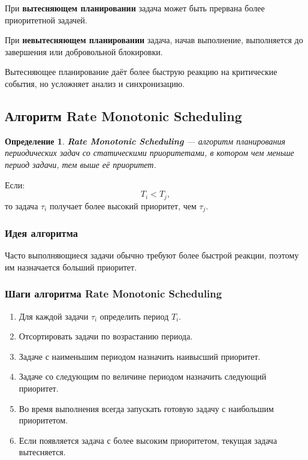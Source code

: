 \documentclass[12pt,a4paper]{article}
\newtheorem{definition}{Определение}
\begin{document}
При \textbf{вытесняющем планировании} задача может быть прервана более приоритетной задачей.

При \textbf{невытесняющем планировании} задача, начав выполнение, выполняется до завершения или добровольной блокировки.

Вытесняющее планирование даёт более быструю реакцию на критические события, но усложняет анализ и синхронизацию.

\subsection{Алгоритм Rate Monotonic Scheduling}

\begin{definition}
\textbf{Rate Monotonic Scheduling} --- алгоритм планирования периодических задач со статическими приоритетами, в котором чем меньше период задачи, тем выше её приоритет.
\end{definition}

Если:
\[
    T_i < T_j,
\]
то задача $\tau_i$ получает более высокий приоритет, чем $\tau_j$.

\subsubsection{Идея алгоритма}

Часто выполняющиеся задачи обычно требуют более быстрой реакции, поэтому им назначается больший приоритет.

\subsubsection{Шаги алгоритма Rate Monotonic Scheduling}

\begin{enumerate}
    \item Для каждой задачи $\tau_i$ определить период $T_i$.
    \item Отсортировать задачи по возрастанию периода.
    \item Задаче с наименьшим периодом назначить наивысший приоритет.
    \item Задаче со следующим по величине периодом назначить следующий приоритет.
    \item Во время выполнения всегда запускать готовую задачу с наибольшим приоритетом.
    \item Если появляется задача с более высоким приоритетом, текущая задача вытесняется.
\end{enumerate}
\end{document}
